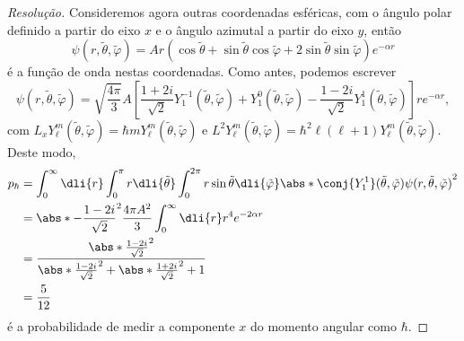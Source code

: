 \begin{proof}[Resolução]
    Consideremos agora outras coordenadas esféricas, com o ângulo polar definido a partir do eixo \(x\) e o ângulo azimutal a partir do eixo \(y\), então
    \begin{equation*}
        \psi(r, \tilde{\theta}, \tilde{\varphi}) = Ar \left(\cos\tilde\theta + \sin\tilde\theta \cos\tilde\varphi + 2 \sin\tilde\theta \sin\tilde\varphi\right) e^{-\alpha r}
    \end{equation*}
    é a função de onda nestas coordenadas. Como antes, podemos escrever
    \begin{equation*}
        \psi(r, \tilde{\theta}, \tilde{\varphi}) = \sqrt{\frac{4\pi}{3}}A \left[\frac{1+2i}{\sqrt{2}}Y_{1}^{-1}(\tilde\theta,\tilde\varphi) + Y_{1}^0(\tilde\theta,\tilde\varphi) - \frac{1 - 2i}{\sqrt{2}}Y_{1}^{1}(\tilde\theta,\tilde\varphi)\right] r e^{-\alpha r},
    \end{equation*}
    com \(L_x Y_{\ell}^{m}(\tilde{\theta}, \tilde{\varphi}) = \hbar m Y_{\ell}^m(\tilde{\theta}, \tilde{\varphi})\) e \(L^2 Y_{\ell}^m(\tilde{\theta}, \tilde{\varphi}) = \hbar^2\ell(\ell + 1)Y_{\ell}^m(\tilde{\theta}, \tilde{\varphi})\). Deste modo,
    \begin{align*}
        p_\hbar &= \int_0^\infty \dli{r} \int_0^\pi r\dli{\tilde\theta}\int_0^{2\pi}r\sin\tilde\theta \dli{\tilde\varphi} \abs*{\conj{Y_{1}^{1}}(\tilde\theta,\tilde\varphi)\psi(r,\tilde\theta,\tilde\varphi)}^2\\
                &= \abs*{-\frac{1 - 2i}{\sqrt{2}}}^2 \frac{4\pi A^2}{3} \int_0^\infty \dli{r} r^4 e^{-2 \alpha r}\\
                &= \frac{\abs*{\frac{1 - 2i}{\sqrt{2}}}^2}{\abs*{\frac{1 - 2i}{\sqrt{2}}}^2 + \abs*{\frac{1+ 2i}{\sqrt{2}}}^2 + 1}\\
                &= \frac{5}{12}
    \end{align*}
    é a probabilidade de medir a componente \(x\) do momento angular como \(\hbar\).

\end{proof}
